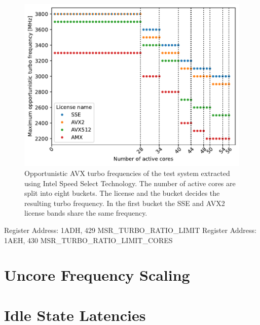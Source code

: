 \begin{figure}[]
    \centering
    \includegraphics[width=0.8\columnwidth]{fig/avx-frequency-license-bands.pdf}
    \caption{\label{fig:p0n-frequencies}Opportunistic AVX turbo frequencies of the test system extracted using Intel Speed Select Technology.
    The number of active cores are split into eight buckets. The license and the bucket decides the resulting turbo frequency.
    In the first bucket the SSE and AVX2 license bands share the same frequency.}
\end{figure}

Register Address: 1ADH, 429 MSR\_TURBO\_RATIO\_LIMIT
Register Address: 1AEH, 430 MSR\_TURBO\_RATIO\_LIMIT\_CORES



\section{Uncore Frequency Scaling}

\section{Idle State Latencies}
